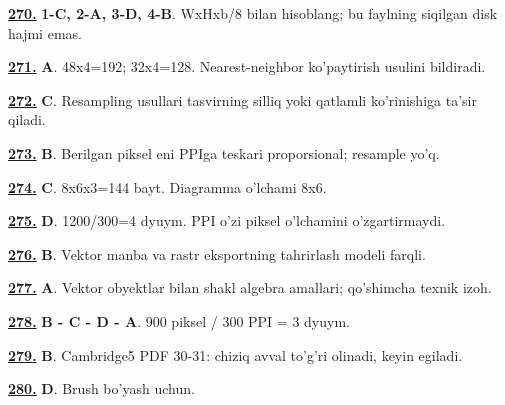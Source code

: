 \documentclass[10pt,a4paper,oneside]{article}
\begin{document}
\noindent\hyperlink{q270}{\textbf{270.}} \textbf{1-C, 2-A, 3-D, 4-B}.  WxHxb/8 bilan hisoblang; bu faylning siqilgan disk hajmi emas.
\par\vspace{3mm}
\noindent\hyperlink{q271}{\textbf{271.}} \textbf{A}.  48x4=192; 32x4=128. Nearest-neighbor ko'paytirish usulini bildiradi.
\par\vspace{3mm}
\noindent\hyperlink{q272}{\textbf{272.}} \textbf{C}.  Resampling usullari tasvirning silliq yoki qatlamli ko'rinishiga ta'sir qiladi.
\par\vspace{3mm}
\noindent\hyperlink{q273}{\textbf{273.}} \textbf{B}.  Berilgan piksel eni PPIga teskari proporsional; resample yo'q.
\par\vspace{3mm}
\noindent\hyperlink{q274}{\textbf{274.}} \textbf{C}.  8x6x3=144 bayt. Diagramma o'lchami 8x6.
\par\vspace{3mm}
\noindent\hyperlink{q275}{\textbf{275.}} \textbf{D}.  1200/300=4 dyuym. PPI o'zi piksel o'lchamini o'zgartirmaydi.
\par\vspace{3mm}
\noindent\hyperlink{q276}{\textbf{276.}} \textbf{B}.  Vektor manba va rastr eksportning tahrirlash modeli farqli.
\par\vspace{3mm}
\noindent\hyperlink{q277}{\textbf{277.}} \textbf{A}.  Vektor obyektlar bilan shakl algebra amallari; qo'shimcha texnik izoh.
\par\vspace{3mm}
\noindent\hyperlink{q278}{\textbf{278.}} \textbf{B - C - D - A}.  900 piksel / 300 PPI = 3 dyuym.
\par\vspace{3mm}
\noindent\hyperlink{q279}{\textbf{279.}} \textbf{B}.  Cambridge5 PDF 30-31: chiziq avval to'g'ri olinadi, keyin egiladi.
\par\vspace{3mm}
\noindent\hyperlink{q280}{\textbf{280.}} \textbf{D}.  Brush bo'yash uchun.
\par\vspace{3mm}
\end{document}
